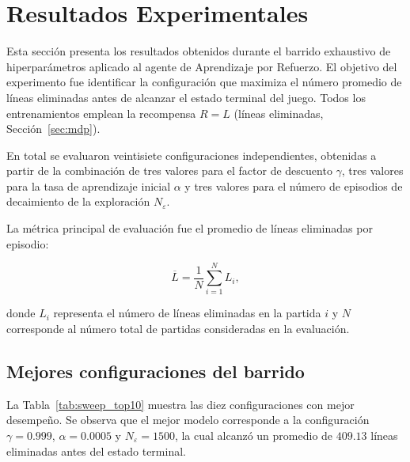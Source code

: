 \section{Resultados Experimentales}
\label{sec:resultados}

Esta sección presenta los resultados obtenidos durante el barrido exhaustivo de hiperparámetros aplicado al agente de Aprendizaje por Refuerzo. El objetivo del experimento fue identificar la configuración que maximiza el número promedio de líneas eliminadas antes de alcanzar el estado terminal del juego. Todos los entrenamientos emplean la recompensa $R = L$ (líneas eliminadas, Sección~\ref{sec:mdp}).

En total se evaluaron veintisiete configuraciones independientes, obtenidas a partir de la combinación de tres valores para el factor de descuento $\gamma$, tres valores para la tasa de aprendizaje inicial $\alpha$ y tres valores para el número de episodios de decaimiento de la exploración $N_{\varepsilon}$.

La métrica principal de evaluación fue el promedio de líneas eliminadas por episodio:

\begin{equation}
\overline{L}
=
\frac{1}{N}
\sum_{i=1}^{N} L_i,
\end{equation}

donde $L_i$ representa el número de líneas eliminadas en la partida $i$ y $N$ corresponde al número total de partidas consideradas en la evaluación.

\subsection{Mejores configuraciones del barrido}

La Tabla~\ref{tab:sweep_top10} muestra las diez configuraciones con mejor desempeño. Se observa que el mejor modelo corresponde a la configuración $\gamma=0.999$, $\alpha=0.0005$ y $N_{\varepsilon}=1500$, la cual alcanzó un promedio de $409.13$ líneas eliminadas antes del estado terminal.

